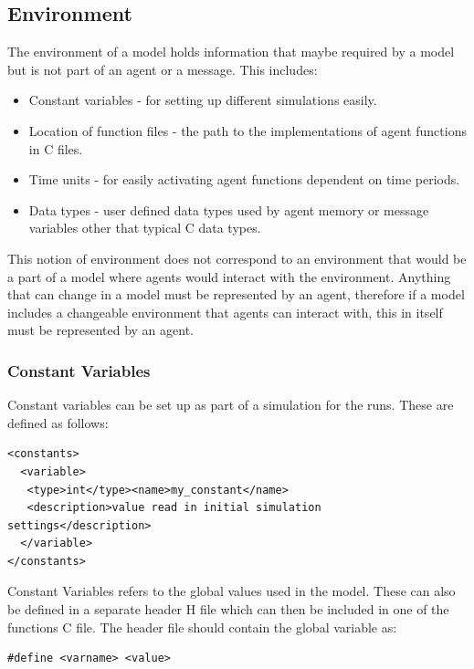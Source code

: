 \documentclass[a4paper,11pt]{article}
\newenvironment{mylisting}
{\begin{list}{}{\setlength{\leftmargin}{1em}}\item\small\bfseries}
{\end{list}}
\begin{document}
\subsection{Environment}

The environment of a model holds information that maybe required by
a model but is not part of an agent or a message. This includes:

\begin{itemize}
\item Constant variables - for setting up different simulations easily.
\item Location of function files - the path to the implementations of agent
functions in C files.
\item Time units - for easily activating agent functions dependent on time
periods.
\item Data types - user defined data types used by agent memory or
message variables other that typical C data types.
\end{itemize}

This notion of environment does not correspond to an environment
that would be a part of a model where agents would interact with the
environment. Anything that can change in a model must be represented
by an agent, therefore if a model includes a changeable environment
that agents can interact with, this in itself must be represented by
an agent.

\subsubsection{Constant Variables}

Constant variables can be set up as part of a simulation for the
runs. These are defined as follows:

\begin{mylisting}
\begin{verbatim}
<constants>
  <variable>
   <type>int</type><name>my_constant</name>
   <description>value read in initial simulation settings</description>
  </variable>
</constants>
\end{verbatim}
\end{mylisting}


Constant Variables refers to the global values used in the model.
These can also be defined in a separate header H file which can then
be included in one of the functions C file. The header file should
contain the global variable as:

 \begin{mylisting}
 \begin{verbatim}
#define <varname> <value>
 \end{verbatim}
 \end{mylisting}
\end{document}
